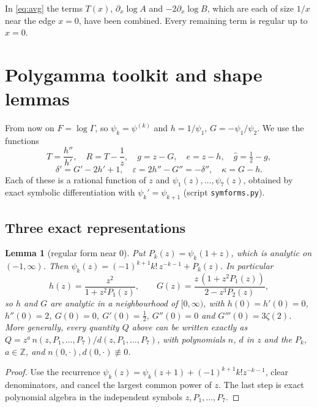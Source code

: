 \documentclass[11pt,a4paper]{article}
\newtheorem{lemma}[theorem]{Lemma}
\theoremstyle{definition}
\theoremstyle{remark}
\newcommand{\eps}{\varepsilon}
\begin{document}
In \eqref{eq:avg} the terms $T(x)$, $\partial_x\log A$ and $-2\partial_x\log B$, which are each of size $1/x$ near the edge $x=0$, have been combined. Every remaining term is regular up to $x=0$.

\section{Polygamma toolkit and shape lemmas}\label{sec:shape}
From now on $F=\log\Gamma$, so $\psi_k=\psi^{(k)}$ and $h=1/\psi_1$, $G=-\psi_1/\psi_2$. We use the functions
\[
T=\frac{h''}{h'},\quad R=T-\frac1z,\quad g=z-G,\quad e=z-h,\quad \hat g=\tfrac12-g,
\]
\[
\delta'=G'-2h'+1,\quad \eps=2h''-G''=-\delta'',\quad \kappa=G-h .
\]
Each of these is a rational function of $z$ and $\psi_1(z),\dots,\psi_7(z)$, obtained by exact symbolic differentiation with $\psi_k'=\psi_{k+1}$ (script \texttt{symforms.py}).

\subsection{Three exact representations}
\begin{lemma}[regular form near $0$]\label{lem:small}
Put $P_k(z)=\psi_k(1+z)$, which is analytic on $(-1,\infty)$. Then $\psi_k(z)=(-1)^{k+1}k!\,z^{-k-1}+P_k(z)$. In particular
\[
h(z)=\frac{z^2}{1+z^2P_1(z)},\qquad G(z)=\frac{z\,(1+z^2P_1(z))}{2-z^3P_2(z)},
\]
so $h$ and $G$ are analytic in a neighbourhood of $[0,\infty)$, with $h(0)=h'(0)=0$, $h''(0)=2$, $G(0)=0$, $G'(0)=\frac12$, $G''(0)=0$ and $G'''(0)=3\zeta(2)$. More generally, every quantity $Q$ above can be written exactly as $Q=z^{a}\,n(z,P_1,\dots,P_7)/d(z,P_1,\dots,P_7)$, with polynomials $n$, $d$ in $z$ and the $P_k$, $a\in\mathbb Z$, and $n(0,\cdot),d(0,\cdot)\not\equiv0$.
\end{lemma}
\begin{proof}
Use the recurrence $\psi_k(z)=\psi_k(z+1)+(-1)^{k+1}k!z^{-k-1}$, clear denominators, and cancel the largest common power of $z$. The last step is exact polynomial algebra in the independent symbols $z,P_1,\dots,P_7$.
\end{proof}
\end{document}

